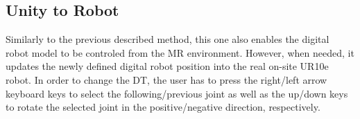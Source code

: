     
    
   


    
   

    \subsection{Unity to Robot}
    Similarly to the previous described method, this one also enables the digital robot model to be controled from the \ac{MR} environment. However, when needed, it updates the newly defined digital robot position into the real on-site UR10e robot. In order to change the \ac{DT}, the user has to press the right/left arrow keyboard keys to select the following/previous joint as well as the up/down keys to rotate the selected joint in the positive/negative direction, respectively.
         
